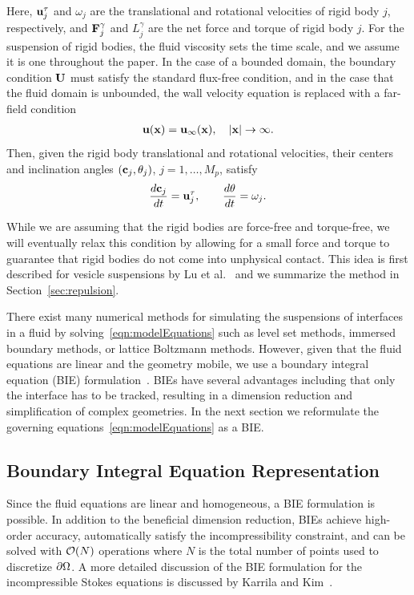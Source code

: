 \documentclass[preprint, 10pt]{elsarticle}
\begin{document}
Here, ${\mathbf{u}}^\tau_j$ and $\omega_j$ are the translational and rotational
velocities of rigid body $j$, respectively, and ${\mathbf{F}}_j^\gamma$ and
$L_j^\gamma$ are the net force and torque of rigid body $j$.  For the
suspension of rigid bodies, the fluid viscosity sets the time scale, and
we assume it is one throughout the paper.  In the case of a bounded
domain, the boundary condition ${\mathbf{U}}$ must satisfy the standard flux-free
condition, and in the case that the fluid domain is unbounded, the wall
velocity equation is replaced with a far-field condition
\begin{align*}
  {\mathbf{u}}({\mathbf{x}}) = {\mathbf{u}}_\infty({\mathbf{x}}), \quad |{\mathbf{x}}| \rightarrow \infty.
\end{align*}
Then, given the rigid body translational and rotational velocities,
their centers and inclination angles $({\mathbf{c}}_j,\theta_j)$,
$j=1,\ldots,M_p$, satisfy
\begin{align}
\begin{split}
  \frac{d{\mathbf{c}}_j}{dt} = {\mathbf{u}}^\tau_j, \qquad 
  \frac{d\theta}{dt} = \omega_j.
\end{split}
\label{eqn:centersAngles}
\end{align}

While we are assuming that the rigid bodies are force-free and
torque-free, we will eventually relax this condition by allowing for a
small force and torque to guarantee that rigid bodies do not come into
unphysical contact.  This idea is first described for vesicle
suspensions by Lu et al.~\cite{Lu2017} and we summarize the method in
Section~\ref{sec:repulsion}.  

There exist many numerical methods for simulating the suspensions of
interfaces in a fluid by solving~\eqref{eqn:modelEquations} such as
level set methods, immersed boundary methods, or lattice Boltzmann
methods.  However, given that the fluid equations are linear and the
geometry mobile, we use a boundary integral equation (BIE)
formulation~\cite{Pozrikidis1992}.  BIEs have several advantages
including that only the interface has to be tracked, resulting in a
dimension reduction and simplification of complex geometries.  In the
next section we reformulate the governing
equations~\eqref{eqn:modelEquations} as a BIE.

\subsection{Boundary Integral Equation Representation}
Since the fluid equations are linear and homogeneous, a BIE formulation
is possible.  In addition to the beneficial dimension reduction, BIEs
achieve high-order accuracy, automatically satisfy the incompressibility
constraint, and can be solved with ${\mathcal{O}}(N)$ operations where $N$ is
the total number of points used to discretize ${\partial}\Omega$.  A more
detailed discussion of the BIE formulation for the incompressible Stokes
equations is discussed by Karrila and Kim~\cite{Karrila1989}.
\end{document}
